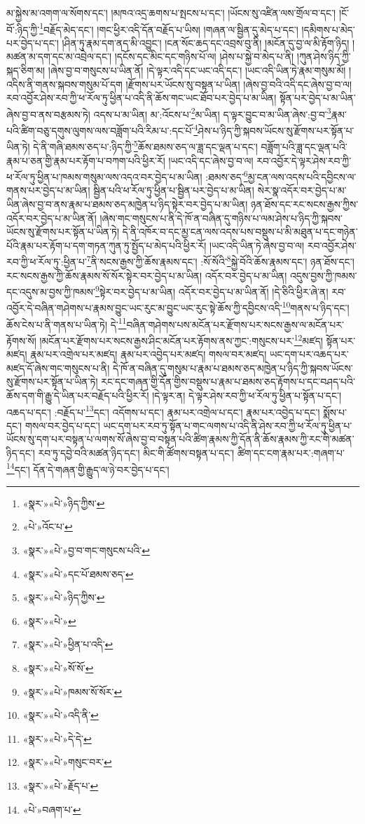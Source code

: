 མ་སྐྱེས་མ་འགག་ལ་སོགས་དང་། །མཁའ་འདྲ་ཆགས་པ་སྤངས་པ་དང་། །ཡོངས་སུ་འཛིན་ལས་གྲོལ་བ་དང་། །ངོ་བོ་:ཉིད་ཀྱི་\footnote{«སྣར་»«པེ་»ཉིད་ཀྱིས་}བརྗོད་མེད་དང་། །གང་ཕྱིར་འདི་དོན་བརྗོད་པ་ཡིས། །གཞན་ལ་སྦྱིན་དུ་མེད་པ་དང་། །དམིགས་པ་མེད་པར་བྱེད་པ་དང་། །ཤིན་ཏུ་རྣམ་དག་ནད་མི་འབྱུང་། །ངན་སོང་ཆད་དང་འབྲས་བུ་ནི། །མངོན་དུ་བྱ་ལ་མི་རྟོག་ཉིད། །མཚན་མ་དག་དང་མ་འབྲེལ་དང་། །དངོས་དང་མིང་དང་གཉིས་པོ་ལ། །ཤེས་པ་སྐྱེ་བ་མེད་པ་ནི། །ཀུན་ཤེས་ཉིད་ཀྱི་སྐད་ཅིག་མ། །ཞེས་བྱ་བ་གསུངས་པ་ཡིན་ནོ། །དེ་ལྟར་འདི་དང་ཡང་འདི་དང་། །ཡང་འདི་ཡིན་ཏེ་རྣམ་གསུམ་མོ། །འདིས་ནི་གནས་སྐབས་གསུམ་པོ་དག །རྫོགས་པར་ཡོངས་སུ་བསྟན་པ་ཡིན། །ཞེས་བྱ་བའི་འདི་དང་ཞེས་བྱ་བ་ལ། རབ་འབྱོར་ཤེས་རབ་ཀྱི་ཕ་རོལ་ཏུ་ཕྱིན་པ་འདི་ནི་ཆོས་གང་ཡང་ཐོབ་པར་བྱེད་པ་མ་ཡིན། སྟོན་པར་བྱེད་པ་མ་ཡིན་ཞེས་བྱ་བ་ནས་བརྩམས་ཏེ། འདས་པ་མ་ཡིན། མ་:འོངས་པ་\footnote{«པེ་»འོང་པ་}མ་ཡིན། ད་ལྟར་བྱུང་བ་མ་ཡིན་ཞེས་:བྱ་བ་\footnote{«སྣར་»«པེ་»བྱ་བ་གང་གསུངས་པའི་}རྣམ་པའི་ཚིག་བཅུ་དགུས་ལུགས་ལས་བཟློག་པའི་རིམ་པ་:དང་པོ་\footnote{«སྣར་»«པེ་»དང་པོ་ཐམས་ཅད་}ཤེས་པ་ཉིད་ཀྱི་སྐབས་ཡོངས་སུ་རྫོགས་པར་སྟོན་པ་ཡིན་ཏེ། དེ་ནི་གཞི་ཐམས་ཅད་པ་:ཉིད་ཀྱི་\footnote{«སྣར་»«པེ་»ཉིད་ཀྱིས་}ཆོས་ཐམས་ཅད་ལ་ཟླ་དང་ལྡན་པ་དང་། བཟློག་པའི་ཟླ་དང་ལྡན་པའི་རྣམ་པ་ཅན་གྱི་རྣམ་པར་རྟོག་པ་བཀག་པའི་ཕྱིར་རོ། །ཡང་འདི་དང་ཞེས་བྱ་བ་ལ། རབ་འབྱོར་དེ་ལྟར་ཤེས་རབ་ཀྱི་ཕ་རོལ་ཏུ་ཕྱིན་པ་ཁམས་གསུམ་ལས་འདའ་བར་བྱེད་པ་མ་ཡིན། :ཐམས་ཅད་\footnote{«སྣར་»«པེ་»}མྱ་ངན་ལས་འདས་པའི་དབྱིངས་ལ་གནས་པར་བྱེད་པ་མ་ཡིན། སྦྱིན་པའི་ཕ་རོལ་ཏུ་ཕྱིན་པ་སྦྱིན་པར་བྱེད་པ་མ་ཡིན། སེར་སྣ་འདོར་བར་བྱེད་པ་མ་ཡིན་ཞེས་བྱ་བ་ནས་རྣམ་པ་ཐམས་ཅད་མཁྱེན་པ་ཉིད་སྟེར་བར་བྱེད་པ་མ་ཡིན། ཉན་ཐོས་དང་རང་སངས་རྒྱས་ཀྱིས་འདོར་བར་བྱེད་པ་མ་ཡིན་ནོ། །ཞེས་གང་གསུངས་པ་ནི་དེ་ཁོ་ན་བཞིན་དུ་གཉིས་པ་ལམ་ཤེས་པ་ཉིད་ཀྱི་སྐབས་ཡོངས་སུ་རྫོགས་པར་སྟོན་པ་ཡིན་ཏེ། དེ་ནི་འཁོར་བ་དང་མྱ་ངན་ལས་འདས་པས་བསྡུས་པ་མི་མཐུན་པ་དང་གཉེན་པོའི་རྣམ་པར་རྟོག་པ་དག་གཏན་ཀུན་ཏུ་སྤྱོད་པ་མེད་པའི་ཕྱིར་རོ། །ཡང་འདི་ཡིན་ཏེ་ཞེས་བྱ་བ་ལ། རབ་འབྱོར་ཤེས་རབ་ཀྱི་ཕ་རོལ་ཏུ་:ཕྱིན་པ་\footnote{«སྣར་»«པེ་»ཕྱིན་པ་འདི་}ནི་སངས་རྒྱས་ཀྱི་ཆོས་རྣམས་དང་། :སོ་སོའི་\footnote{«སྣར་»«པེ་»སོ་སོ་}སྐྱེ་བོའི་ཆོས་རྣམས་དང་། ཉན་ཐོས་དང་། རང་སངས་རྒྱས་ཀྱི་ཆོས་རྣམས་སོ་སོར་སྟེར་བར་བྱེད་པ་མ་ཡིན། འདོར་བར་བྱེད་པ་མ་ཡིན། འདུས་བྱས་ཀྱི་ཁམས་དང་འདུས་མ་བྱས་ཀྱི་ཁམས་\footnote{«སྣར་»«པེ་»ཁམས་སོ་སོར་}སྟེར་བར་བྱེད་པ་མ་ཡིན། འདོར་བར་བྱེད་པ་མ་ཡིན་ནོ། །དེ་ཅིའི་ཕྱིར་ཞེ་ན། རབ་འབྱོར་དེ་བཞིན་གཤེགས་པ་རྣམས་བྱུང་ཡང་རུང་མ་བྱུང་ཡང་རུང་སྟེ་ཆོས་ཀྱི་དབྱིངས་འདི་\footnote{«སྣར་»«པེ་»འདི་ནི་}གནས་པ་ཉིད་དང་། ཆོས་ངེས་པ་ནི་གནས་པ་ཡིན་ཏེ། དེ་\footnote{«སྣར་»«པེ་»དེ་དེ་}བཞིན་གཤེགས་པས་མངོན་པར་རྫོགས་པར་སངས་རྒྱས་ལ་མངོན་པར་རྟོགས་སོ། །མངོན་པར་རྫོགས་པར་སངས་རྒྱས་ཤིང་མངོན་པར་རྟོགས་ནས་ཀྱང་:གསུངས་པར་\footnote{«སྣར་»«པེ་»གསུང་བར་}མཛད། སྟོན་པར་མཛད། རྣམ་པར་འགྲེལ་པར་མཛད། རྣམ་པར་འབྱེད་པར་མཛད། གསལ་བར་མཛད། ཡང་དག་པར་འཆད་པར་མཛད་དོ་ཞེས་གང་གསུངས་པ་ནི། དེ་ཁོ་ན་བཞིན་དུ་གསུམ་པ་རྣམ་པ་ཐམས་ཅད་མཁྱེན་པ་ཉིད་ཀྱི་སྐབས་ཡོངས་སུ་རྫོགས་པར་སྟོན་པ་ཡིན་ཏེ། རང་དང་གཞན་གྱི་དོན་གྱིས་བསྡུས་པ་རྣམ་པ་ཐམས་ཅད་རྟོགས་པ་དང་བཤད་པའི་ཆོས་དག་གི་རྒྱུ་དེ་ཡིན་པར་བརྗོད་པའི་ཕྱིར་རོ། །དེ་ལྟར་ན། དེ་ལྟར་ཤེས་རབ་ཀྱི་ཕ་རོལ་ཏུ་ཕྱིན་པ་སྟོན་པ་དང་། འཆད་པ་དང་། :བརྗོད་པ་\footnote{«སྣར་»«པེ་»རྗོད་པ་}དང་། འདོགས་པ་དང་། རྣམ་པར་འགྲེལ་པ་དང་། རྣམ་པར་འབྱེད་པ་དང་། སྨོས་པ་དང་། གསལ་བར་བྱེད་པ་དང་། ཡང་དག་པར་རབ་ཏུ་སྟོན་པ་གང་ལགས་པ་འདི་ནི་ཤེས་རབ་ཀྱི་ཕ་རོལ་ཏུ་ཕྱིན་པ་ཡོངས་སུ་དག་པར་བསྟན་པ་ལགས་སོ་ཞེས་བྱ་བ་བསྟན་པའི་ཚིག་རྣམས་ཀྱི་དོན་ནི་ཆོས་རྣམས་ཀྱི་རང་གི་མཚན་ཉིད་དང་། རབ་ཏུ་དབྱེ་བའི་མཚན་ཉིད་དང་། མིང་གི་ཚོགས་བསྟན་པ་དང་། ཚིག་དང་ངག་རྣམ་པར་:གཞག་པ་\footnote{«པེ་»བཞག་པ་}དང་། དོན་དེ་གཞན་གྱི་རྒྱུད་ལ་ཉེ་བར་བྱེད་པ་དང་། 